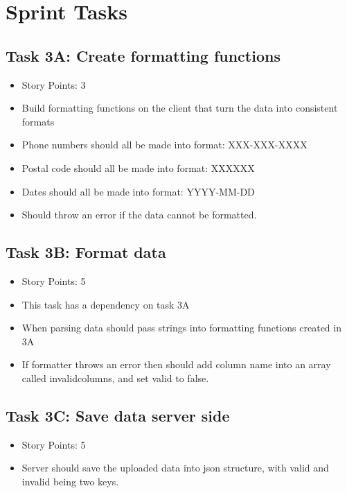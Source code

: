 \documentclass[12pt]{article}
\begin{document}
\textcolor{black}{\tableofcontents}
\pagebreak


\section{Sprint Tasks}

\subsection{Task 3A: Create formatting functions}
\begin{itemize}%
\item Story Points: 3
\item Build formatting functions on the client that turn the data into consistent formats 
\item Phone numbers should all be made into format: XXX-XXX-XXXX
\item Postal code should all be made into format: XXXXXX
\item Dates should all be made into format: YYYY-MM-DD
\item Should throw an error if the data cannot be formatted.
\end{itemize}

\subsection{Task 3B: Format data}
\begin{itemize}%
\item Story Points: 5
\item This task has a dependency on task 3A
\item When parsing data should pass strings into formatting functions created in 3A
\item If formatter throws an error then should add column name into an array called invalidcolumns, and set valid to false.
\end{itemize}

\subsection{Task 3C: Save data server side}
\begin{itemize}%
\item Story Points: 5
\item Server should save the uploaded data into json structure, with valid and invalid being two keys.
\end{itemize}
\end{document}
